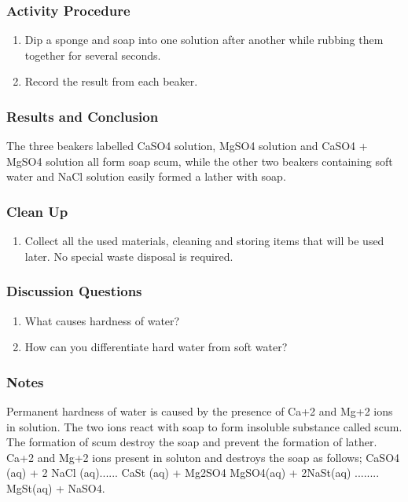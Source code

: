 \subsubsection*{Activity Procedure}
\begin{enumerate}
\item{Dip a sponge and soap into one solution after another while rubbing them together for several seconds.}
\item{Record the result from each beaker.}
\end{enumerate}

\subsubsection*{Results and Conclusion}
The three beakers labelled CaSO4 solution, MgSO4 solution and CaSO4 + MgSO4 solution all form soap scum, while the other two beakers containing soft water and NaCl solution easily formed a lather with soap.

\subsubsection*{Clean Up}
\begin{enumerate}
\item{Collect all the used materials, cleaning and storing items that will be used later. No special waste disposal is required.}
\end{enumerate}

\subsubsection*{Discussion Questions}
\begin{enumerate}
\item{What causes hardness of water?}
\item{How can you differentiate hard water from soft water?}
\end{enumerate}

\subsubsection*{Notes}
Permanent hardness of water is caused by the presence of Ca+2 and Mg+2 ions in solution. The two ions react with soap to form insoluble substance called scum. The formation of scum destroy the soap and prevent the formation of lather. Ca+2 and Mg+2 ions present in soluton and destroys the soap as follows;
CaSO4 (aq) + 2 NaCl (aq)...... CaSt (aq) + Mg2SO4
MgSO4(aq) + 2NaSt(aq) ........ MgSt(aq) + NaSO4.

